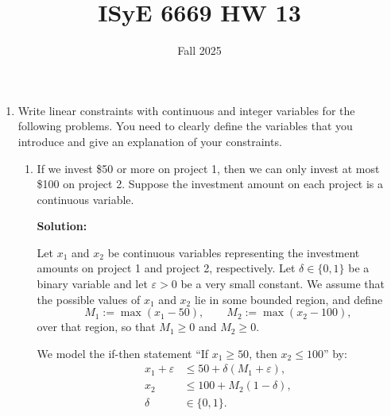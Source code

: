 \documentclass{article}
\title{ISyE 6669 HW 13}
\date{Fall 2025}
\begin{document}
\maketitle

\begin{enumerate}
    \item Write linear constraints with continuous and integer variables for the following problems. You need to clearly define the variables that you introduce and give an explanation of your constraints.
    \begin{enumerate}
        \item If we invest \$50 or more on project 1, then we can only invest at most \$100 on project 2. Suppose the investment amount on each project is a continuous variable.
        
        \textbf{Solution:}
        
        Let $x_1$ and $x_2$ be continuous variables representing the investment amounts on project 1 and project 2, respectively. Let $\delta \in \{0,1\}$ be a binary variable and let $\varepsilon > 0$ be a very small constant. We assume that the possible values of $x_1$ and $x_2$ lie in some bounded region, and define
        \[
            M_1 := \max (x_1 - 50), \qquad
            M_2 := \max (x_2 - 100),
        \]
        over that region, so that $M_1 \ge 0$ and $M_2 \ge 0$.
        
        We model the if-then statement ``If $x_1 \geq 50$, then $x_2 \leq 100$'' by:
        \begin{align*}
            x_1 + \varepsilon &\leq 50 + \delta (M_1 + \varepsilon), \\
            x_2 &\leq 100 + M_2 (1 - \delta), \\
            \delta &\in \{0, 1\}.
        \end{align*}
        

\end{enumerate}
\end{enumerate}
\end{document}
